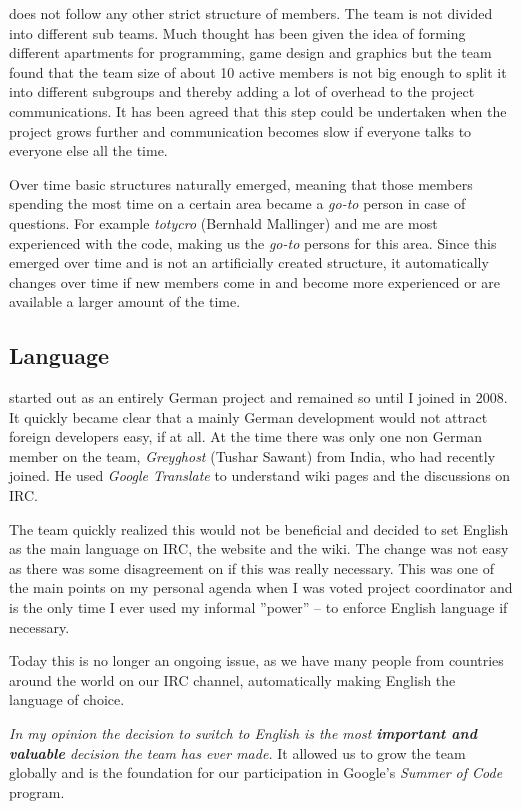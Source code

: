 \UH{} does not follow any other strict structure of members. The team is not divided into different sub teams. Much
thought has been given the idea of forming different apartments for programming, game design and graphics but the team
found that the team size of about 10 active members is not big enough to split it into different subgroups and thereby
adding a lot of overhead to the project communications. It has been agreed that this step could be undertaken when the
project grows further and communication becomes slow if everyone talks to everyone else all the time.

Over time basic structures naturally emerged, meaning that those members spending the most time on a certain area became a
\textit{go-to} person in case of questions. For example \textit{totycro} (Bernhald Mallinger) and me are most
experienced with the code, making us the \textit{go-to} persons for this area. Since this emerged over time and is not
an artificially created structure, it automatically changes over time if new members come in and become more experienced
or are available a larger amount of the time.

\subsection{Language}
\UH{} started out as an entirely German project and remained so until I joined in 2008. It quickly became clear that a
mainly German development would not attract foreign developers easy, if at all. At the time there was only one non German
member on the team, \textit{Greyghost} (Tushar Sawant) from India, who had recently joined. He used \textit{Google
Translate} to understand wiki pages and the discussions on IRC.

The team quickly realized this would not be beneficial and decided to set English as the main language on IRC, the
website and the wiki. The change was not easy as there was some disagreement on if this was really necessary. This was one
of the main points on my personal agenda when I was voted project coordinator and is the only time I ever used my
informal ''power'' -- to enforce English language if necessary.

Today this is no longer an ongoing issue, as we have many people from countries around the world on our IRC channel,
automatically making English the language of choice.

\textit{In my opinion the decision to switch to English is the most \textbf{important and valuable} decision the team
has ever made.} It allowed us to grow the team globally and is the foundation for our participation in Google's \textit{Summer
of Code} program.

